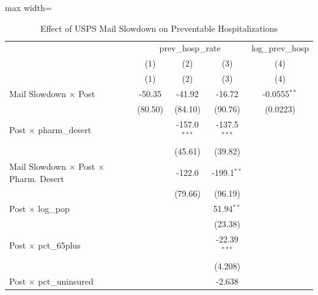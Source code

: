 
\begin{table}[htbp]
   \caption{\label{tab:main} Effect of USPS Mail Slowdown on Preventable Hospitalizations}
   \bigskip
   \centering
   \begin{adjustbox}{max width=\textwidth}
   \begin{tabular}{lcccc}
      \toprule
       & \multicolumn{3}{c}{prev\_hosp\_rate} & log\_prev\_hosp\\
                                                           & (1)                   & (2)            & (3)             & (4) \\   
                                                           & (1)                   & (2)            & (3)             & (4)\\  
      \midrule 
      Mail Slowdown $\times$ Post                          & -50.35                & -41.92         & -16.72          & -0.0555$^{**}$\\   
                                                           & (80.50)               & (84.10)        & (90.76)         & (0.0223)\\   
      Post $\times$ pharm\_desert                          &                       & -157.0$^{***}$ & -137.5$^{***}$  &   \\   
                                                           &                       & (45.61)        & (39.82)         &   \\   
      Mail Slowdown $\times$ Post $\times$ Pharm. Desert   &                       & -122.0         & -199.1$^{**}$   &   \\   
                                                           &                       & (79.66)        & (96.19)         &   \\   
      Post $\times$ log\_pop                               &                       &                & 51.94$^{**}$    &   \\   
                                                           &                       &                & (23.38)         &   \\   
      Post $\times$ pct\_65plus                            &                       &                & -22.39$^{***}$  &   \\   
                                                           &                       &                & (4.208)         &   \\   
      Post $\times$ pct\_uninsured                         &                       &                & -2.638          &   \\   

\end{tabular}
\end{adjustbox}
\end{table}
